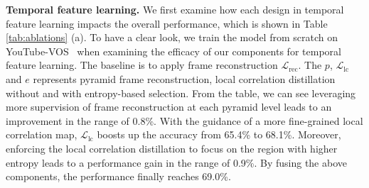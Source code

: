 \documentclass{article}
\begin{document}
 
 \textbf{Temporal feature learning.} We first examine how each design in temporal feature learning impacts the overall performance, which is shown in Table \ref{tab:ablations} (a). To have a clear look, we train the model from scratch on YouTube-VOS~\cite{xu2018youtube} when examining the efficacy of our components for temporal feature learning. The baseline is to apply frame reconstruction $\mathcal{L}_{\mathrm{rec}}$. The $p$, $\mathcal{L}_{\mathrm{lc}}$ and $e$ represents pyramid frame reconstruction, local correlation distillation without and with entropy-based selection. From the table, we can see leveraging more supervision of frame reconstruction at each pyramid level leads to an improvement in the range of 0.8\%. With the guidance of a more fine-grained local correlation map, $\mathcal{L}_{\mathrm{lc}}$ boosts up the accuracy from 65.4\% to 68.1\%. Moreover, enforcing the local correlation distillation to focus on the region with higher entropy leads to a performance gain in the range of 0.9\%. By fusing the above components, the performance finally reaches 69.0\%.
 
\end{document}
